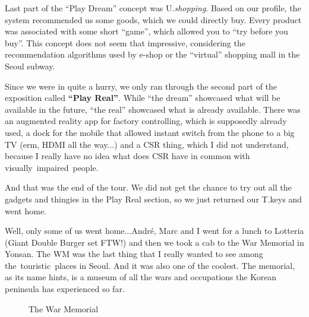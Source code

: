 \begin{post}
\begin{content}

Last part of the ``Play Dream'' concept was U.\textit{shopping}. Based on our profile, the system recommended us some goods, which we could directly buy. Every product was associated with some short ``game'', which allowed you to ``try before you buy''. This concept does not seem that impressive, considering the recommendation algorithms used by e-shop or the ``virtual'' shopping mall in the Seoul subway.

Since we were in quite a hurry, we only ran through the second part of the exposition called \textbf{``Play Real''}. While ``the dream'' showcased what will be available in the future, ``the real'' showcased what is already available. There was an augmented reality app for factory controlling, which is supposedly already used, a dock for the mobile that allowed instant switch from the phone to a big TV (erm, HDMI all the way...) and a CSR thing, which I did not understand, because I really have no idea what does CSR have in common with visually impaired people.

And that was the end of the tour. We did not get the chance to try out all the gadgets and thingies in the Play Real section, so we just returned our T.keys and went home.

Well, only some of us went home...André, Marc and I went for a lunch to Lotteria (Giant Double Burger set FTW!) and then we took a cab to the War Memorial in Yonsan. The WM was the last thing that I really wanted to see among the touristic places in Seoul. And it was also one of the coolest. The memorial, as its name hints, is a museum of all the wars and occupations the Korean peninsula has experienced so far.

\begin{figure}[!h]
\centering
{}
\caption{The War Memorial}
\end{figure}


\end{content}
\end{post}
